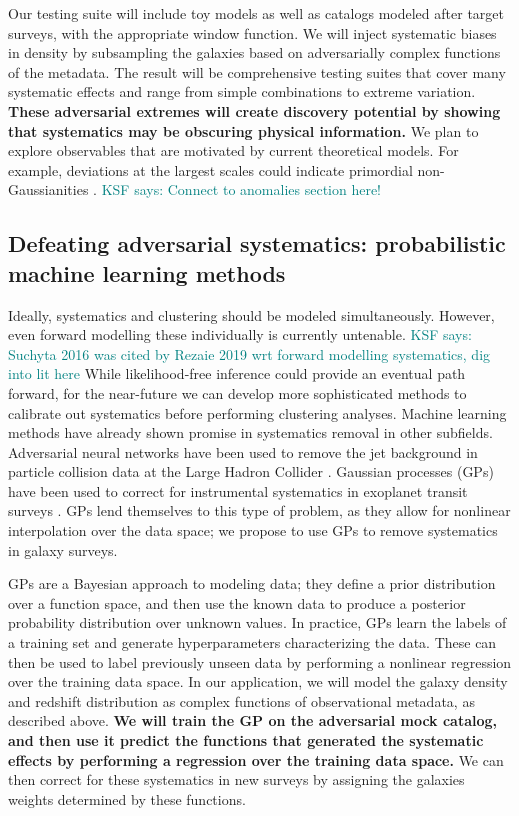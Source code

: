 \documentclass[12pt, fullpage, letterpaper]{article}
\newcommand{\KSF}[1]{\textcolor{teal}{KSF says: #1}}
\begin{document}
Our testing suite will include toy models as well as catalogs modeled after target surveys, with the appropriate window function.
We will inject systematic biases in density by subsampling the galaxies based on adversarially complex functions of the metadata.
The result will be comprehensive testing suites that cover many systematic effects and range from simple combinations to extreme variation.
\textbf{These adversarial extremes will create discovery potential by showing that systematics may be obscuring physical information.}
We plan to explore observables that are motivated by current theoretical models.
For example, deviations at the largest scales could indicate primordial non-Gaussianities \citep{Dalal2008}. \KSF{Connect to anomalies section here!}


\subsection{Defeating adversarial systematics: probabilistic machine learning methods}

Ideally, systematics and clustering should be modeled simultaneously. 
However, even forward modelling these individually is currently untenable. \KSF{Suchyta 2016 was cited by Rezaie 2019 wrt forward modelling systematics, dig into lit here} 
While likelihood-free inference could provide an eventual path forward, for the near-future we can develop more sophisticated methods to calibrate out systematics before performing clustering analyses.
Machine learning methods have already shown promise in systematics removal in other subfields.
Adversarial neural networks have been used to remove the jet background in particle collision data at the Large Hadron Collider \citep{Shimmin2017}.
Gaussian processes (GPs) have been used to correct for instrumental systematics in exoplanet transit surveys \citep{Gibson2012, Aigrain2016}. 
GPs lend themselves to this type of problem, as they allow for nonlinear interpolation over the data space; we propose to use GPs to remove systematics in galaxy surveys.

GPs are a Bayesian approach to modeling data; they define a prior distribution over a function space, and then use the known data to produce a posterior probability distribution over unknown values. 
In practice, GPs learn the labels of a training set and generate hyperparameters characterizing the data.
These can then be used to label previously unseen data by performing a nonlinear regression over the training data space.
In our application, we will model the galaxy density and redshift distribution as complex functions of observational metadata, as described above.
\textbf{We will train the GP on the adversarial mock catalog, and then use it predict the functions that generated the systematic effects by performing a regression over the training data space.}
We can then correct for these systematics in new surveys by assigning the galaxies weights determined by these functions.
\end{document}
